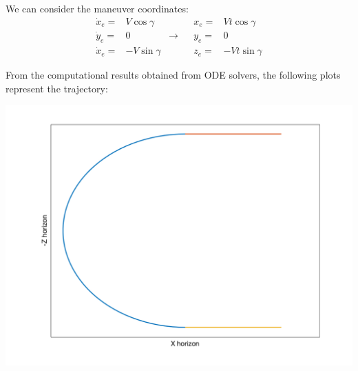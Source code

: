 We can consider the maneuver coordinates:
\begin{align*}
	\dot{x}_e=&V\cos\gamma&&&	x_e=&Vt\cos\gamma \\
	\dot{y}_e=&0& \rightarrow&&	y_e=&0\\
	\dot{x}_e=&-V\sin\gamma&&&z_e=&-Vt\sin\gamma
\end{align*}

From the computational results obtained from ODE solvers, the following plots represent the trajectory:
\begin{center}
	\includegraphics[width=\linewidth]{../matlab/trajectory.png}
	\vspace{0.5cm}
	\vspace{0.25cm}
\end{center}